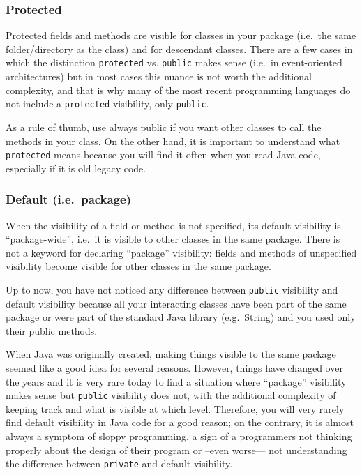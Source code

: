 \subsubsection{Protected}
\label{sec:protected}

Protected fields and methods are visible for classes in your package
(i.e.~the same folder/directory as the class) and for descendant
classes. There are a few cases in which the distinction
\verb+protected+ vs. \verb+public+ makes sense (i.e.~in event-oriented
architectures) but in most cases this nuance is not worth the
additional complexity, and that
is why many of the most recent programming languages do not include a
\verb+protected+ visibility, only \verb+public+. 

As a rule of thumb, use always public if you want other classes to
call the methods in your class. On the other hand, it is important to understand
what \verb+protected+ means because you will find it often when you
read Java code, especially if it is old legacy code. 

\subsubsection{Default (i.e.~package)}
\label{sec:default-i.e.-package}

When the visibility of a field or method is not specified, its default
visibility is ``package-wide'', i.e.~it is visible to other classes in
the same package. There is not a keyword for declaring ``package''
visibility: fields and methods of unspecified visibility become
visible for other classes in the same package. 

Up to now, you have not noticed any difference
between \verb+public+ visibility and default visibility because all
your interacting classes have been part of the same package or were
part of the standard Java library (e.g.~String) and you used only
their public methods. 

When Java was originally created, making things visible to the same
package seemed like a good idea for several reasons. However, things
have changed over the years and it is very rare today to find a
situation where ``package'' visibility makes sense but \verb+public+
visibility does not, with the additional complexity of keeping track
and what is visible at which level. Therefore, you will very rarely
find default visibility in Java code for a good reason; on the
contrary, it is almost
always a symptom of sloppy programming, a sign of a programmers not
thinking properly about the design of their program or --even worse---
not understanding the difference between \verb+private+ and default
visibility.   

